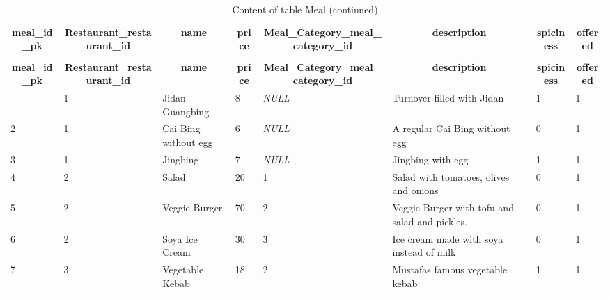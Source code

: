 \documentclass[parskip=half, a4paper, DIV=14]{scrartcl}
\begin{document}
%
%
 \begin{longtable}{|l|l|l|l|l|l|l|l|} 
 \hline \endhead \hline \endfoot \hline 
 \caption{Content of table Meal} \label{tab:Meal-data} \\\hline \multicolumn{1}{|c|}{\textbf{meal\_id\_pk}} & \multicolumn{1}{|c|}{\textbf{Restaurant\_restaurant\_id}} & \multicolumn{1}{|c|}{\textbf{name}} & \multicolumn{1}{|c|}{\textbf{price}} & \multicolumn{1}{|c|}{\textbf{Meal\_Category\_meal\_category\_id}} & \multicolumn{1}{|c|}{\textbf{description}} & \multicolumn{1}{|c|}{\textbf{spiciness}} & \multicolumn{1}{|c|}{\textbf{offered}} \\ \hline \hline  \endfirsthead 
\caption{Content of table Meal (continued)} \\ \hline \multicolumn{1}{|c|}{\textbf{meal\_id\_pk}} & \multicolumn{1}{|c|}{\textbf{Restaurant\_restaurant\_id}} & \multicolumn{1}{|c|}{\textbf{name}} & \multicolumn{1}{|c|}{\textbf{price}} & \multicolumn{1}{|c|}{\textbf{Meal\_Category\_meal\_category\_id}} & \multicolumn{1}{|c|}{\textbf{description}} & \multicolumn{1}{|c|}{\textbf{spiciness}} & \multicolumn{1}{|c|}{\textbf{offered}} \\ \hline \hline \endhead \endfoot
1 & 1 & Jidan Guangbing & 8 & \textit{NULL} & Turnover filled with Jidan & 1 & 1 \\ \hline 
2 & 1 & Cai Bing without egg & 6 & \textit{NULL} & A regular Cai Bing without egg & 0 & 1 \\ \hline 
3 & 1 & Jingbing & 7 & \textit{NULL} & Jingbing with egg & 1 & 1 \\ \hline 
4 & 2 & Salad & 20 & 1 & Salad with tomatoes, olives and onions  & 0 & 1 \\ \hline 
5 & 2 & Veggie Burger & 70 & 2 & Veggie Burger with tofu and salad and pickles. & 0 & 1 \\ \hline 
6 & 2 & Soya Ice Cream & 30 & 3 & Ice cream made with soya instead of milk & 0 & 1 \\ \hline 
7 & 3 & Vegetable Kebab & 18 & 2 & Mustafas famous vegetable kebab & 1 & 1 \\ \hline 
 \end{longtable}
\end{document}
